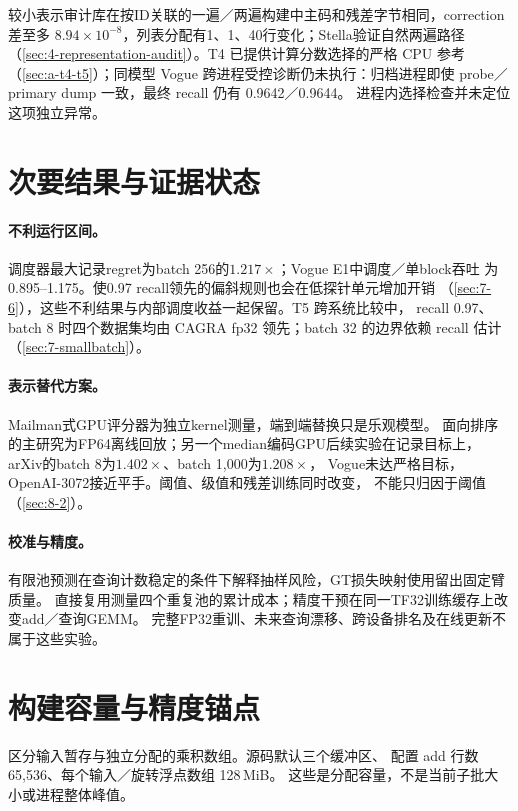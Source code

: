 较小表示审计库在按ID关联的一遍／两遍构建中主码和残差字节相同，correction差至多
$8.94\times10^{-8}$，列表分配有1、1、40行变化；Stella验证自然两遍路径
（\cref{sec:4-representation-audit}）。T4 已提供计算分数选择的严格 CPU 参考
（\cref{sec:a-t4-t5}）；同模型 Vogue 跨进程受控诊断仍未执行：归档进程即使
probe／primary dump 一致，最终 recall 仍有 0.9642／0.9644。
进程内选择检查并未定位这项独立异常。

\section{次要结果与证据状态}
\label{sec:b-secondary}
\paragraph{不利运行区间。}
调度器最大记录regret为batch 256的$1.217\times$；Vogue E1中调度／单block吞吐
为0.895--1.175。使0.97 recall领先的偏斜规则也会在低探针单元增加开销
（\cref{sec:7-6}），这些不利结果与内部调度收益一起保留。T5 跨系统比较中，
recall 0.97、batch 8 时四个数据集均由 CAGRA fp32 领先；batch 32 的边界依赖
recall 估计（\cref{sec:7-smallbatch}）。

\paragraph{表示替代方案。}
Mailman式GPU评分器为独立kernel测量，端到端替换只是乐观模型。
面向排序的主研究为FP64离线回放；另一个median编码GPU后续实验在记录目标上，
arXiv的batch 8为$1.402\times$、batch 1,000为$1.208\times$，
Vogue未达严格目标，OpenAI-3072接近平手。阈值、级值和残差训练同时改变，
不能只归因于阈值（\cref{sec:8-2}）。

\paragraph{校准与精度。}
有限池预测在查询计数稳定的条件下解释抽样风险，GT损失映射使用留出固定臂质量。
直接复用测量四个重复池的累计成本；精度干预在同一TF32训练缓存上改变add／查询GEMM。
完整FP32重训、未来查询漂移、跨设备排名及在线更新不属于这些实验。

\section{构建容量与精度锚点}
\label{sec:b-full-review}

区分输入暂存与独立分配的乘积数组。源码默认三个缓冲区、
配置 add 行数 65,536、每个输入／旋转浮点数组 128\,MiB。
这些是分配容量，不是当前子批大小或进程整体峰值。

